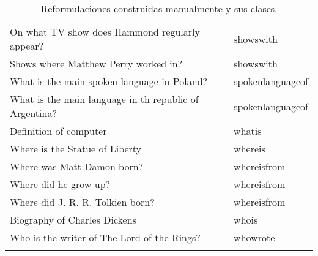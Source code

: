 \begin{longtable}{l l}
On what TV show does Hammond regularly appear? & showswith \\
Shows where Matthew Perry worked in? & showswith \\
What is the main spoken language in Poland? & spokenlanguageof \\
What is the main language in th republic of Argentina? & spokenlanguageof \\
Definition of computer & whatis \\
Where is the Statue of Liberty & whereis \\
Where was Matt Damon born? & whereisfrom \\
Where did he grow up? & whereisfrom \\
Where did J. R. R. Tolkien born? & whereisfrom \\
Biography of Charles Dickens & whois \\
Who is the writer of The Lord of the Rings? & whowrote \\
\hline
\caption{Reformulaciones construidas manualmente y sus clases.}
\end{longtable}